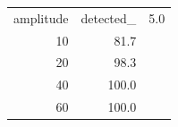 \begin{tabular}{rr}
\toprule
amplitude & detected_%
 & 5.0 \\
10 & 81.7 \\
20 & 98.3 \\
40 & 100.0 \\
60 & 100.0 \\
\bottomrule
\end{tabular}
